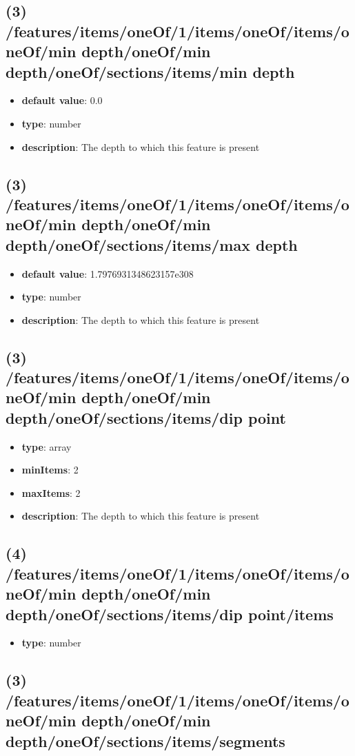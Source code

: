 \subsection{(3) /features/items/oneOf/1/items/oneOf/items/oneOf/min depth/oneOf/min depth/oneOf/sections/items/min depth}
\begin{itemize}[leftmargin=3em]\item {\bf default value}: 0.0
\item {\bf type}: number
\item {\bf description}: The depth to which this feature is present
\end{itemize}\subsection{(3) /features/items/oneOf/1/items/oneOf/items/oneOf/min depth/oneOf/min depth/oneOf/sections/items/max depth}
\begin{itemize}[leftmargin=3em]\item {\bf default value}: 1.7976931348623157e308
\item {\bf type}: number
\item {\bf description}: The depth to which this feature is present
\end{itemize}\subsection{(3) /features/items/oneOf/1/items/oneOf/items/oneOf/min depth/oneOf/min depth/oneOf/sections/items/dip point}
\begin{itemize}[leftmargin=3em]\item {\bf type}: array
\item {\bf minItems}: 2
\item {\bf maxItems}: 2
\item {\bf description}: The depth to which this feature is present
\end{itemize}\subsection{(4) /features/items/oneOf/1/items/oneOf/items/oneOf/min depth/oneOf/min depth/oneOf/sections/items/dip point/items}
\begin{itemize}[leftmargin=4em]\item {\bf type}: number
\end{itemize}\subsection{(3) /features/items/oneOf/1/items/oneOf/items/oneOf/min depth/oneOf/min depth/oneOf/sections/items/segments}
